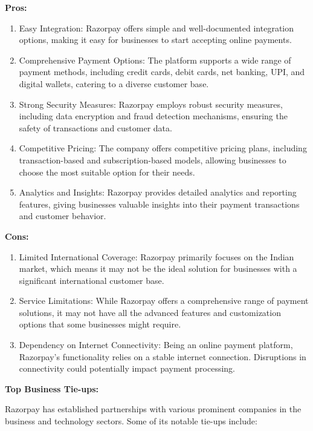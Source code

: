 \textbf{Pros:}

\begin{enumerate}
  \item Easy Integration: Razorpay offers simple and well-documented integration options, making it easy for businesses to start accepting online payments.
  \item Comprehensive Payment Options: The platform supports a wide range of payment methods, including credit cards, debit cards, net banking, UPI, and digital wallets, catering to a diverse customer base.
  \item Strong Security Measures: Razorpay employs robust security measures, including data encryption and fraud detection mechanisms, ensuring the safety of transactions and customer data.
  \item Competitive Pricing: The company offers competitive pricing plans, including transaction-based and subscription-based models, allowing businesses to choose the most suitable option for their needs.
  \item Analytics and Insights: Razorpay provides detailed analytics and reporting features, giving businesses valuable insights into their payment transactions and customer behavior.
\end{enumerate}

\textbf{Cons:}

\begin{enumerate}
  \item Limited International Coverage: Razorpay primarily focuses on the Indian market, which means it may not be the ideal solution for businesses with a significant international customer base.
  \item Service Limitations: While Razorpay offers a comprehensive range of payment solutions, it may not have all the advanced features and customization options that some businesses might require.
  \item Dependency on Internet Connectivity: Being an online payment platform, Razorpay's functionality relies on a stable internet connection. Disruptions in connectivity could potentially impact payment processing.
\end{enumerate}

\textbf{Top Business Tie-ups:}

Razorpay has established partnerships with various prominent companies in the business and technology sectors. Some of its notable tie-ups include:

